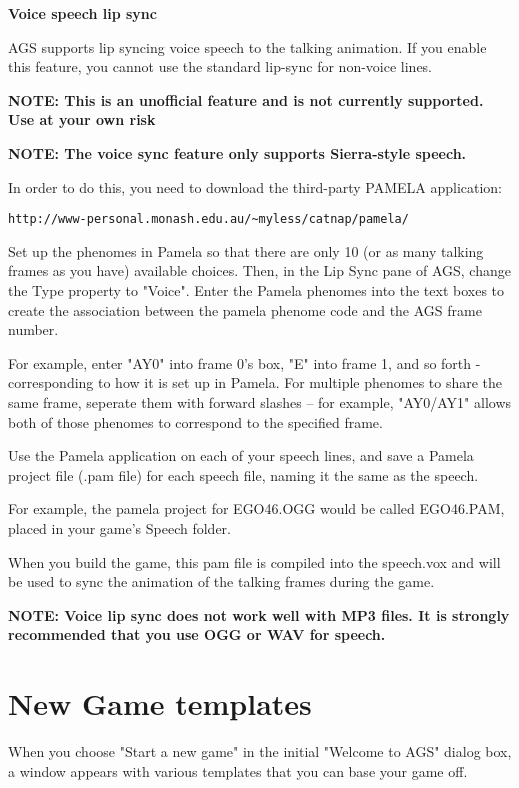 \bf{Voice speech lip sync}

AGS supports lip syncing voice speech to the talking animation. If you enable this
feature, you cannot use the standard lip-sync for non-voice lines.

\bf{NOTE: This is an unofficial feature and is not currently supported. Use at
your own risk}

\bf{NOTE:} The voice sync feature only supports Sierra-style speech.

In order to do this, you need to download the third-party PAMELA application:

\verb$http://www-personal.monash.edu.au/~myless/catnap/pamela/$

Set up the phenomes in Pamela so that there are only 10 (or as many talking frames as you have)
available choices. Then, in the Lip Sync pane of AGS, change the Type property to "Voice".
Enter the Pamela phenomes into the text boxes to create the association
between the pamela phenome code and the AGS frame number.

For example, enter "AY0" into frame 0's box, "E" into frame 1, and so forth - corresponding
to how it is set up in Pamela. For multiple phenomes to share the same frame, seperate them
with forward slashes -- for example, "AY0/AY1" allows both of those phenomes to correspond
to the specified frame.

Use the Pamela application on each of your speech lines, and save a Pamela project file
(.pam file) for each speech file, naming it the same as the speech.

For example, the pamela project for  EGO46.OGG  would be called  EGO46.PAM, placed
in your game's Speech folder.

When you build the game, this pam file is compiled into the speech.vox and will be used
to sync the animation of the talking frames during the game.

\bf{NOTE:} Voice lip sync does not work well with MP3 files. It is strongly recommended
that you use OGG or WAV for speech.



\section{New Game templates}%

When you choose "Start a new game" in the initial "Welcome to AGS" dialog
box, a window appears with various templates that you can base your game off.

